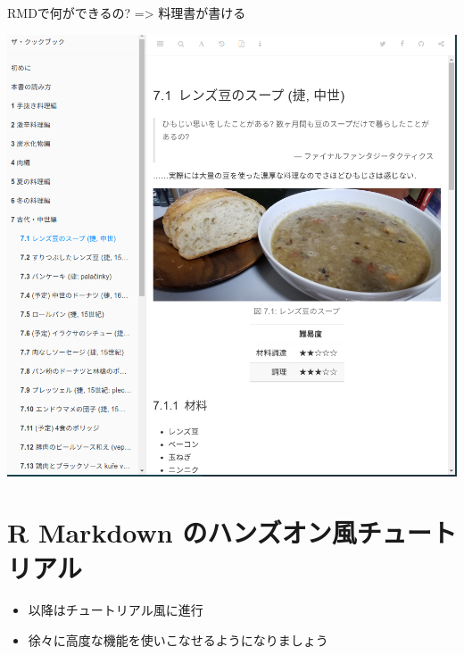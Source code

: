 \documentclass[
  ignorenonframetext,
]{beamer}
\providecommand{\tightlist}{%
  \setlength{\itemsep}{0pt}\setlength{\parskip}{0pt}}
\begin{document}
\begin{frame}{RMDで何ができるの? =\textgreater{} 料理書が書ける}
\protect\hypertarget{rmdux3067ux4f55ux304cux3067ux304dux308bux306e-ux6599ux7406ux66f8ux304cux66f8ux3051ux308b}{}
\begin{center}\includegraphics[width=1\linewidth,height=1\textheight,keepaspectratio]{img/cook1} \end{center}
\end{frame}

\hypertarget{r-markdown-ux306eux30cfux30f3ux30baux30aaux30f3ux98a8ux30c1ux30e5ux30fcux30c8ux30eaux30a2ux30eb}{%
\section{R Markdown のハンズオン風チュートリアル}\label{r-markdown-ux306eux30cfux30f3ux30baux30aaux30f3ux98a8ux30c1ux30e5ux30fcux30c8ux30eaux30a2ux30eb}}

\begin{frame}{}
\protect\hypertarget{section}{}
\begin{itemize}
\tightlist
\item
  以降はチュートリアル風に進行
\item
  徐々に高度な機能を使いこなせるようになりましょう
\end{itemize}
\end{frame}
\end{document}

